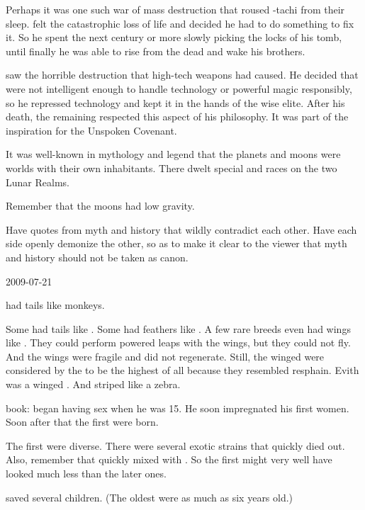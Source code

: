 Perhaps it was one such war of mass destruction that roused \Nexagglachel-tachi from their sleep. 
\Nexagglachel felt the catastrophic loss of life and decided he had to do something to fix it. 
So he spent the next century or more slowly picking the locks of his tomb, until finally he was able to rise from the dead and wake his brothers. 


\Nexagglachel saw the horrible destruction that high-tech weapons had caused.
He decided that \humanoids were not intelligent enough to handle technology or powerful magic responsibly, so he repressed technology and kept it in the hands of the wise elite. 
After his death, the remaining \dragons respected this aspect of his philosophy.
It was part of the inspiration for the Unspoken Covenant. 


It was well-known in mythology and legend that the planets and moons were worlds with their own inhabitants. 
There dwelt special \demihuman and \demiscatha races on the two Lunar Realms.

Remember that the moons had low gravity. 


Have quotes from myth and history that wildly contradict each other.
Have each side openly demonize the other, so as to make it clear to the viewer that myth and history should not be taken as canon. 



2009-07-21

\Nephilim had tails like monkeys.

Some \demihumans had tails like \nephilim.
Some had feathers like \resphain.
A few rare breeds even had wings like \resphain. 
They could perform powered leaps with the wings, but they could not fly. 
And the wings were fragile and did not regenerate. 
Still, the winged \humans were considered by the \resphain to be the highest of all \humans because they resembled resphain. 
Evith was a winged \human. 
And striped like a zebra. 

\Thanatzil book:
  \Thanatzil began having sex when he was 15.
  He soon impregnated his first \nephil women.
  Soon after that the first \humans were born.

  The first \humans were diverse. 
  There were several exotic strains that quickly died out. 
  Also, remember that \humans quickly mixed with \nephilim. 
  So the first \humans might very well have looked much less \quo{\human} than the later ones. 
  
  \Morza saved several \human children. 
  (The oldest \humans were as much as six years old.)

